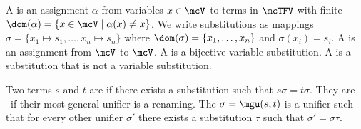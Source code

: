 \begin{definition}\label{def:substitution}
A  is an assignment \( \alpha \) from variables \( x\in\mcV \) to terms in \( \mcTFV \)
with finite  \( \dom(\alpha) = \{ x\in\mcV\mid\alpha(x) \neq x \} \).
We write substitutions as mappings \( \sigma=\{ x_1\mapsto s_1,\ldots,x_n\mapsto s_n \} \)
where \( \dom(\sigma)=\{ x_1,\ldots,x_n \} \) and \( \sigma(x_i)=s_i \).
A  is an assignment from \( \mcV \) to \( \mcV \).
A  is a bijective variable substitution.
A  is a substitution that is not a variable substitution.
\end{definition}
\begin{definition}\label{def:unifier}
Two terms \( s \) and \( t \) are  if there exists a substitution such that \( s\sigma=t\sigma \).
They are  if their most general unifier is a renaming.
The  \( \sigma=\mgu(s,t) \) is a unifier such that
for every other unifier \( \sigma' \) there exists a substitution \( \tau \) such that
\( \sigma' = \sigma \tau \).
\end{definition}
